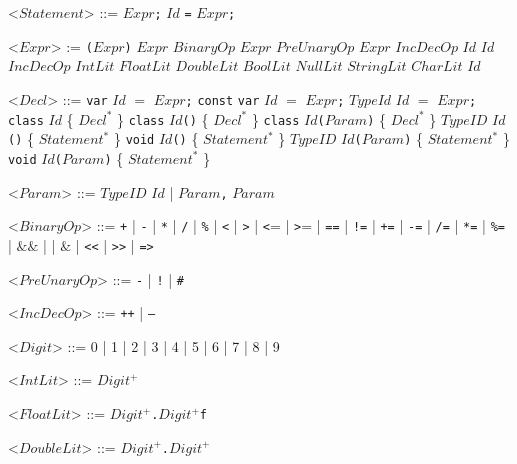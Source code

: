 \documentclass{article}
\newcommand{\gtext}[1]{<$#1$>}
\newcommand{\glit}[1]{\texttt{#1}}
\begin{document}
\begin{grammar}
	\gtext{Statement} ::= $Expr$\glit{;}
	\alt $Id$ \glit{=} $Expr$\glit{;} %
	
	\gtext{Expr} := \glit{(}$Expr$\glit{)}
	\alt $Expr$ $BinaryOp$ $Expr$
	\alt $PreUnaryOp$ $Expr$
	\alt $IncDecOp$ $Id$
	\alt $Id$ $IncDecOp$
	\alt $IntLit$
	\alt $FloatLit$
	\alt $DoubleLit$
	\alt $BoolLit$
	\alt $NullLit$
	\alt $StringLit$
	\alt $CharLit$
	\alt $Id$
	
	\gtext{Decl} ::= \glit{var} $Id$ $=$ $Expr$\glit{;}
	\alt \glit{const} \glit{var} $Id$ $=$ $Expr$\glit{;}
	\alt $TypeId$ $Id$ $=$ $Expr$\glit{;}
	\alt \glit{class} $Id$ \{ $Decl^*$ \}
	\alt \glit{class} $Id$\glit{()} \{ $Decl^*$ \}
	\alt \glit{class} $Id$\glit{(}$Param$\glit{)} \{ $Decl^*$ \}
	\alt $TypeID$ $Id$\glit{()} \{ $Statement^*$ \}
	\alt \glit{void} $Id$\glit{()} \{ $Statement^*$ \}
	\alt $TypeID$ $Id$\glit{(}$Param$\glit{)} \{ $Statement^*$ \}
	\alt \glit{void} $Id$\glit{(}$Param$\glit{)} \{ $Statement^*$ \}
	
	\gtext{Param} ::= $TypeID$ $Id$ | $Param$\glit{,} $Param$
	
	\gtext{BinaryOp} ::= \glit{+} | \glit{-} | \glit{*} | \glit{/} | \glit{\%} | \glit{\textless} | \glit{\textgreater} | \glit{\textless}= | \glit{\textgreater}= | \glit{==} | \glit{!=} | \glit{+=} | \glit{-=} | \glit{/=} | \glit{*=} | \glit{\%=}
	\alt \glit{\textbar\textbar} | $\&\&$ | \glit{\textbar} | $\&$ | \glit{\textless\textless} | \glit{\textgreater\textgreater} | \glit{=>}
	
	\gtext{PreUnaryOp} ::= \glit{-} | \glit{!} | \glit{\#}
	
	\gtext{IncDecOp} ::= \glit{++} | \glit{--}

	\gtext{Digit} ::= 0 | 1 | 2 | 3 | 4 | 5 | 6 | 7 | 8 | 9

	\gtext{IntLit} ::= $Digit^+$
	
	\gtext{FloatLit} ::= $Digit^+$\glit{.}$Digit^+$\glit{f}
	
	\gtext{DoubleLit} ::= $Digit^+$\glit{.}$Digit^+$
	
\end{grammar}
\newpage
\end{document}
